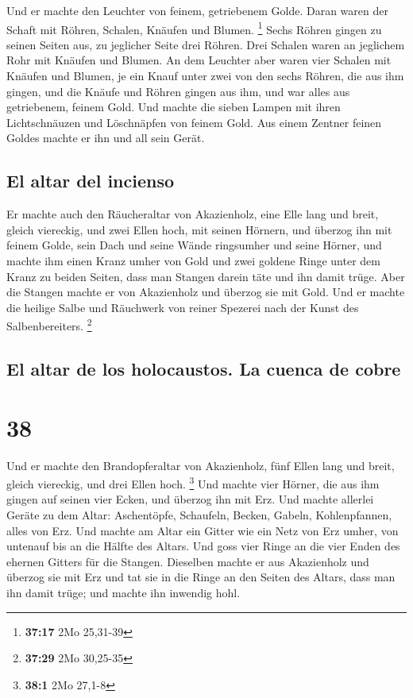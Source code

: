  Und er machte den Leuchter von feinem, getriebenem
Golde. Daran waren der Schaft mit Röhren, Schalen, Knäufen und Blumen.
\footnote{\textbf{37:17} 2Mo 25,31-39}  Sechs Röhren
gingen zu seinen Seiten aus, zu jeglicher Seite drei Röhren.
 Drei Schalen waren an jeglichem Rohr mit Knäufen und
Blumen.  An dem Leuchter aber waren vier Schalen mit
Knäufen und Blumen,  je ein Knauf unter zwei von den
sechs Röhren, die aus ihm gingen,  und die Knäufe und
Röhren gingen aus ihm, und war alles aus getriebenem, feinem Gold.
 Und machte die sieben Lampen mit ihren Lichtschnäuzen
und Löschnäpfen von feinem Gold.  Aus einem Zentner
feinen Goldes machte er ihn und all sein Gerät.

\hypertarget{el-altar-del-incienso}{%
\subsection{El altar del incienso}\label{el-altar-del-incienso}}

 Er machte auch den Räucheraltar von Akazienholz, eine
Elle lang und breit, gleich viereckig, und zwei Ellen hoch, mit seinen
Hörnern,  und überzog ihn mit feinem Golde, sein Dach und
seine Wände ringsumher und seine Hörner, und machte ihm einen Kranz
umher von Gold  und zwei goldene Ringe unter dem Kranz zu
beiden Seiten, dass man Stangen darein täte und ihn damit trüge.
 Aber die Stangen machte er von Akazienholz und überzog
sie mit Gold.  Und er machte die heilige Salbe und
Räuchwerk von reiner Spezerei nach der Kunst des Salbenbereiters.
\footnote{\textbf{37:29} 2Mo 30,25-35}

\hypertarget{el-altar-de-los-holocaustos.-la-cuenca-de-cobre}{%
\subsection{El altar de los holocaustos. La cuenca de
cobre}\label{el-altar-de-los-holocaustos.-la-cuenca-de-cobre}}

\hypertarget{section-37}{%
\section{38}\label{section-37}}

 Und er machte den Brandopferaltar von Akazienholz, fünf
Ellen lang und breit, gleich viereckig, und drei Ellen hoch. \footnote{\textbf{38:1}
  2Mo 27,1-8}  Und machte vier Hörner, die aus ihm gingen
auf seinen vier Ecken, und überzog ihn mit Erz.  Und
machte allerlei Geräte zu dem Altar: Aschentöpfe, Schaufeln, Becken,
Gabeln, Kohlenpfannen, alles von Erz.  Und machte am Altar
ein Gitter wie ein Netz von Erz umher, von untenauf bis an die Hälfte
des Altars.  Und goss vier Ringe an die vier Enden des
ehernen Gitters für die Stangen.  Dieselben machte er aus
Akazienholz und überzog sie mit Erz  und tat sie in die
Ringe an den Seiten des Altars, dass man ihn damit trüge; und machte ihn
inwendig hohl.

